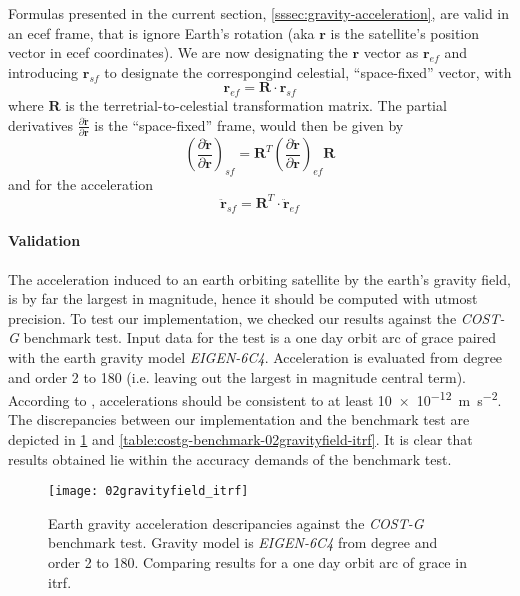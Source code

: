 Formulas presented in the current section, \ref{sssec:gravity-acceleration}, 
are valid in an \gls{ecef} frame, that is ignore Earth's rotation (aka $\bm{r}$ is 
the satellite's position vector in \gls{ecef} coordinates). We are now designating 
the $\bm{r}$ vector as $\bm{r}_{ef}$ and introducing $\bm{r}_{sf}$ to designate the 
correspongind celestial, ``space-fixed'' vector, with 
\begin{equation}
  \bm{r}_{ef} = \bm{R} \cdot \bm{r}_{sf}
\end{equation}
where $\bm{R}$ is the terretrial-to-celestial transformation matrix. The partial 
derivatives $\frac{\partial \bm{\ddot{r}}}{\partial \bm{r}}$ is the ``space-fixed'' 
frame, would then be given by
\begin{equation}
  \left( \frac{\partial \bm{\ddot{r}}}{\partial \bm{r}} \right) _{sf} = 
  \bm{R}^T 
  \left( \frac{\partial \bm{\ddot{r}}}{\partial \bm{r}} \right) _{ef}
  \bm{R}
\end{equation}
and for the acceleration
\begin{equation}
  \bm{\ddot{r}}_{sf} = \bm{R}^T \cdot \bm{\ddot{r}}_{ef}
\end{equation}

\paragraph{Validation}\label{sssec:gravity-acceleration-acceleration}

The acceleration induced to an earth orbiting satellite by the earth's gravity 
field, is by far the largest in magnitude, hence it should be computed with utmost 
precision. To test our implementation, we checked our results against the \emph{COST-G} 
benchmark test. Input data for the test is a one day orbit arc of \gls{grace} paired
with the earth gravity model \emph{EIGEN-6C4}. Acceleration is evaluated from degree
and order 2 to 180 (i.e. leaving out the largest in magnitude central term). According 
to \cite{Lasser23}, accelerations should be consistent to at least \SI{10e-12}{\metre\per\square\second}.
The discrepancies between our implementation and the benchmark test are depicted in 
\ref{fig:costg-benchmark-02gravityfield-itrf} and \ref{table:costg-benchmark-02gravityfield-itrf}. 
It is clear that results obtained lie within the accuracy demands of the benchmark test.

\begin{figure}
  \centering
  \texttt{[image: 02gravityfield\_itrf]}
  \caption{Earth gravity acceleration descripancies against the \emph{COST-G} 
    benchmark test. Gravity model is \emph{EIGEN-6C4} from degree and order 2 to 180. 
    Comparing results for a one day orbit arc of \gls{grace} in \gls{itrf}.}
  \label{fig:costg-benchmark-02gravityfield-itrf}
\end{figure}

